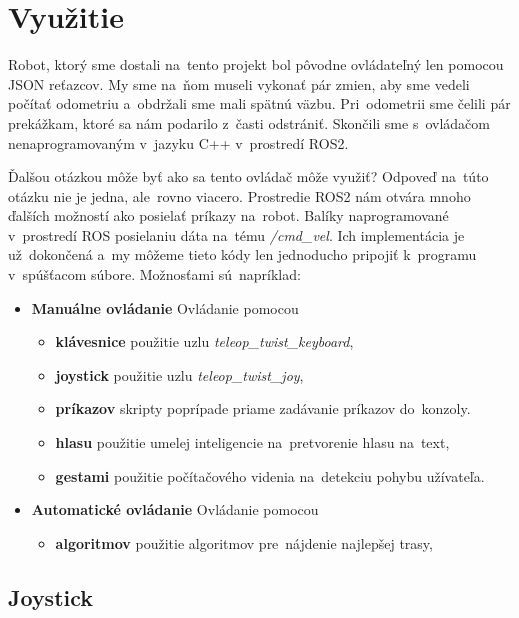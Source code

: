 
\section{Využitie}
\label{sec:vyuzitie}

Robot, ktorý sme dostali na~tento projekt bol pôvodne ovládateľný len pomocou JSON reťazcov. My sme na~ňom museli
vykonať pár zmien, aby sme vedeli počítať odometriu a~obdržali sme mali spätnú väzbu. Pri~odometrii sme čelili pár
prekážkam, ktoré sa nám podarilo z~časti odstrániť. Skončili sme s~ovládačom nenaprogramovaným v~jazyku C++
v~prostredí ROS2.

Ďalšou otázkou môže byť ako sa tento ovládač môže využiť? Odpoveď na~túto otázku nie je jedna, ale~rovno viacero.
Prostredie ROS2 nám otvára mnoho ďalších možností ako posielať príkazy na~robot. Balíky naprogramované v~prostredí ROS
posielaniu dáta na~tému \textit{/cmd\_vel}. Ich implementácia je už~dokončená a~my môžeme tieto kódy len jednoducho pripojiť
k~programu v~spúšťacom súbore. Možnosťami sú~napríklad:

\begin{itemize}
	\item \textbf{Manuálne ovládanie} Ovládanie pomocou
		\begin{itemize}
			\item \textbf{klávesnice} použitie uzlu \textit{teleop\_twist\_keyboard},
			\item \textbf{joystick} použitie uzlu \textit{teleop\_twist\_joy},
			\item \textbf{príkazov} skripty poprípade priame zadávanie príkazov do~konzoly.
			\item \textbf{hlasu} použitie umelej inteligencie na~pretvorenie hlasu na~text,
			\item \textbf{gestami} použitie počítačového videnia na~detekciu pohybu užívateľa.
		\end{itemize}
	\item \textbf{Automatické ovládanie} Ovládanie pomocou
		\begin{itemize}
			\item \textbf{algoritmov} použitie algoritmov pre~nájdenie najlepšej trasy,
		\end{itemize}
\end{itemize}

\subsection{Joystick}
\label{subsec:joystick}

